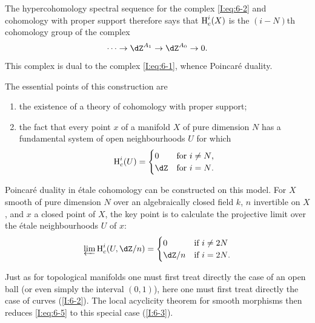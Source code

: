The hypercohomology spectral sequence for the complex
\eqref{I:eq:6-2} and cohomology with proper support therefore says that
$\operatorname{H}_c^i(X)$ is the $(i-N)$th cohomology group of the complex
\begin{equation}\label{I:eq:6-3}
  \cdots \to \dZ^{A_1} \to \dZ^{A_0} \to 0 \text{.}
\end{equation}
This complex is dual to the complex \eqref{I:eq:6-1}, whence Poincaré
duality.

The essential points of this construction are
\begin{enumerate}[\indent a)]
  \item the existence of a theory of cohomology with proper support;
  \item the fact that every point $x$ of a manifold $X$ of pure dimension
    $N$ has a fundamental system of open neighbourhoods $U$ for which
    \begin{equation}\label{I:eq:6-4}
      \h_c^i(U) = \begin{cases}
                    0   & \text{for $i\ne N$,} \\
                    \dZ & \text{for $i=N$.}
                  \end{cases}
    \end{equation}
\end{enumerate}

Poincaré duality in étale cohomology can be constructed on this model.
For $X$ smooth of pure dimension $N$ over an algebraically closed field
$k$, $n$ invertible on $X$, and $x$ a closed point of $X$, the key
point is to calculate the projective limit over the étale neighbourhoods
$U$ of $x$:
\begin{equation}\label{I:eq:6-5}
  \varprojlim \h_c^i(U,\dZ/n)
    = \begin{cases}
        0     & \text{if $i\ne 2N$} \\
        \dZ/n & \text{if $i=2N$.}
      \end{cases}
\end{equation}

Just as for topological manifolds one must first treat directly the case
of an open ball (or even simply the interval $(0,1)$), here one must
first treat directly the case of curves (\ref{I:6-2}). The local
acyclicity theorem for smooth morphisms then reduces
\eqref{I:eq:6-5} to this special case (\ref{I:6-3}).

